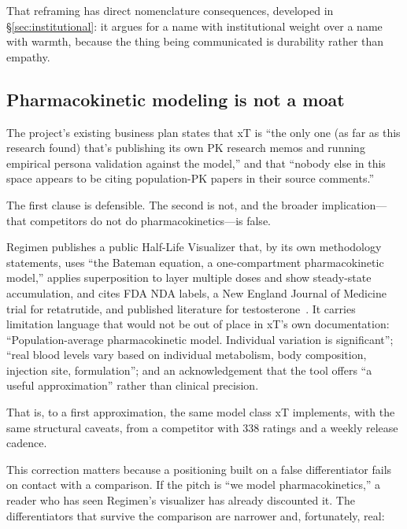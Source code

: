 \documentclass[11pt,a4paper]{article}
\begin{document}
That reframing has direct nomenclature consequences, developed in
\S\ref{sec:institutional}: it argues for a name with institutional
weight over a name with warmth, because the thing being communicated is
durability rather than empathy.

\subsection{Pharmacokinetic modeling is not a moat}
\label{sec:notamoat}

The project's existing business plan states that xT is ``the only one
(as far as this research found) that's publishing its own PK research
memos and running empirical persona validation against the model,'' and
that ``nobody else in this space appears to be citing population-PK
papers in their source comments.''

The first clause is defensible. The second is not, and the broader
implication---that competitors do not do pharmacokinetics---is false.

Regimen publishes a public Half-Life Visualizer that, by its own
methodology statements, uses ``the Bateman equation, a one-compartment
pharmacokinetic model,'' applies superposition to layer multiple doses
and show steady-state accumulation, and cites FDA NDA labels, a New
England Journal of Medicine trial for retatrutide, and published
literature for testosterone~\cite{regimenhalflife}. It carries
limitation language that would not be out of place in xT's own
documentation: ``Population-average pharmacokinetic model. Individual
variation is significant''; ``real blood levels vary based on individual
metabolism, body composition, injection site, formulation''; and an
acknowledgement that the tool offers ``a useful approximation'' rather
than clinical precision.

That is, to a first approximation, the same model class xT implements,
with the same structural caveats, from a competitor with 338 ratings
and a weekly release cadence.

This correction matters because a positioning built on a false
differentiator fails on contact with a comparison. If the pitch is ``we
model pharmacokinetics,'' a reader who has seen Regimen's visualizer
has already discounted it. The differentiators that survive the
comparison are narrower and, fortunately, real:
\end{document}
